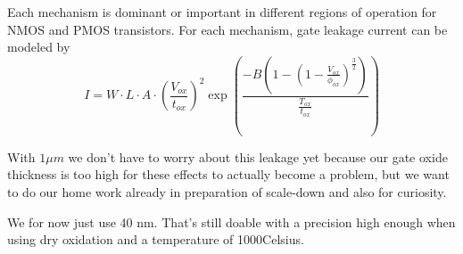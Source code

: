 Each mechanism is dominant or important in different regions of operation for NMOS and PMOS transistors. For each mechanism, gate leakage current can be modeled by
\begin{equation}
I = W \cdot L \cdot A \cdot \left(\frac{V_{ox}}{t_{ox}}\right)^2\exp\left(\frac{-B\left(1-\left(1-\frac{V_{ox}}{\phi_{ox}}\right)^{\frac{3}{2}}\right)}{\frac{T_{ox}}{t_{ox}}}\right)
\end{equation}



With $1 \mu m$ we don't have to worry about this leakage yet because our gate oxide thickness is too high for these effects to actually become a problem, but we want to do our home work already in preparation of scale-down and also for curiosity.

We for now just use 40 nm. That's still doable with a precision high enough when using dry oxidation and a temperature of 1000\degree Celsius.



